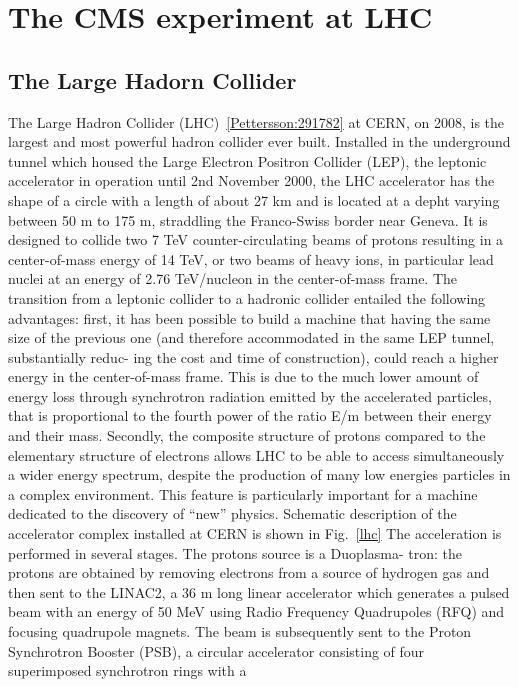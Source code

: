 \chapter{The CMS experiment at LHC}

\section{The Large Hadorn Collider}
The Large Hadron Collider (LHC)~\ref{Pettersson:291782}  at CERN,  on 2008, is the largest and most powerful hadron collider ever built. Installed in the
underground tunnel which housed the Large Electron Positron Collider (LEP),
the leptonic accelerator in operation until 2nd November 2000, the LHC accelerator has
the shape of a circle with a length of about 27 km and is located at a depht varying
between 50 m to 175 m, straddling the Franco-Swiss border near Geneva. It is designed
to collide two 7 TeV counter-circulating beams of protons resulting in a center-of-mass
energy of 14 TeV, or two beams of heavy ions, in particular lead nuclei at an energy of
2.76 TeV/nucleon in the center-of-mass frame.
The transition from a leptonic collider to a hadronic collider entailed the following
advantages: first, it has been possible to build a machine that having the same size of the
previous one (and therefore accommodated in the same LEP tunnel, substantially reduc-
ing the cost and time of construction), could reach a higher energy in the center-of-mass
frame. This is due to the much lower amount of energy loss through synchrotron radiation
emitted by the accelerated particles, that is proportional to the fourth power of the ratio
E/m between their energy and their mass. Secondly, the composite structure of protons
compared to the elementary structure of electrons allows LHC to be able to access simultaneously a wider energy spectrum, despite the production of many low energies particles in a complex environment. This feature is particularly important for a machine dedicated
to the discovery of “new” physics.
Schematic description of the accelerator complex installed at CERN is shown in Fig.~\ref{lhc}
The acceleration is performed in several stages. The protons source is a Duoplasma-
tron: the protons are obtained by removing electrons from a source of hydrogen gas
and then sent to the LINAC2, a 36 m long linear accelerator which generates a pulsed
beam with an energy of 50 MeV using Radio Frequency Quadrupoles (RFQ) and focusing
quadrupole magnets. The beam is subsequently sent to the Proton Synchrotron Booster
(PSB), a circular accelerator consisting of four superimposed synchrotron rings with a
